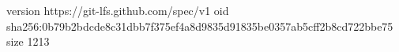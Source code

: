 version https://git-lfs.github.com/spec/v1
oid sha256:0b79b2bdcde8c31dbb7f375ef4a8d9835d91835be0357ab5cff2b8cd722bbe75
size 1213
